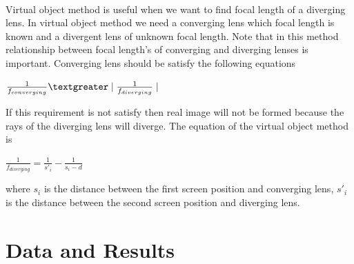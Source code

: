 \documentclass[a4paper,12pt]{report}
\begin{document}
\\
Virtual object method is useful when we want to find focal length of a diverging lens. In virtual object method we need a converging lens which focal length is known and a divergent lens of unknown focal length. Note that in this method relationship between focal length's of converging and diverging lenses is important. Converging lens should be satisfy the following equations
\begin{center}
{\Large 	$\frac{1}{f_{converging}}\textgreater \mid \frac{1}{f_{diverging}}\mid$}
\end{center}
If this requirement is not satisfy then real image will not be formed because the rays of the diverging lens will diverge. The equation of the virtual object method is
\begin{center}
	{\Large $\frac{1}{f_{diverging}}=\frac{1}{s'_{i}}-\frac{1}{s_{i}-d}$}
\end{center}
where $s_{i}$ is the distance between the first screen position and converging lens, $s'_{i}$ is the distance between the second screen position and diverging lens.




























\chapter{Data and Results}
\end{document}
